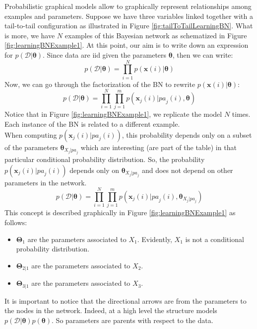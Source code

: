 Probabilistic graphical models allow to graphically represent relationships among examples and parameters. Suppose we have three variables linked together with a tail-to-tail configuration as illustrated in Figure \ref{fig:tailToTailLearningBN}. What is more, we have $N$ examples of this Bayesian network as schematized in Figure \ref{fig:learningBNExample1}. At this point, our aim is to write down an expression for $p(\mathcal{D}|\pmb{\theta})$. Since data are iid given the parameters $\pmb{\theta}$, then we can write:
$$p(\mathcal{D}|\pmb{\theta}) = \prod_{i=1}^N p(\pmb{x}(i) | \pmb{\theta})$$
Now, we can go through the factorization of the BN to rewrite $p(\pmb{x}(i) | \pmb{\theta})$:
$$p(\mathcal{D}|\pmb{\theta}) = \prod_{i=1}^N \prod_{j=1}^m p(\pmb{x}_j(i) | \mathit{pa}_j(i), \pmb{\theta})$$
Notice that in Figure \ref{fig:learningBNExample1}, we replicate the model $N$ times. Each instance of the BN is related to a different example.\\
When computing $p(\pmb{x}_j(i) | \mathit{pa}_j(i))$, this probability depends only on a subset of the parameters $\pmb{\theta}_{X_j | \mathit{pa}_j}$ which are interesting (are part of the table) in that particular conditional probability distribution. So, the probability $p(\pmb{x}_j(i) | \mathit{pa}_j(i))$ depends only on $\pmb{\theta}_{X_j | \mathit{pa}_j}$ and does not depend on other parameters in the network.
\begin{equation}
\label{eq:factorizationLearningBN}
  p(\mathcal{D}|\pmb{\theta}) = \prod_{i=1}^N \prod_{j=1}^m p(\pmb{x}_j(i) | \mathit{pa}_j(i), \pmb{\theta}_{X_j | \mathit{pa}_j})  
\end{equation}
This concept is described graphically in Figure \ref{fig:learningBNExample1} as follows:
\begin{itemize}
    \item $\pmb{\Theta}_1$ are the parameters associated to $X_1$. Evidently, $X_1$ is not a conditional probability distribution.
    \item $\pmb{\Theta}_{2|1}$ are the parameters associated to $X_2$.
    \item $\pmb{\Theta}_{3|1}$ are the parameters associated to $X_3$.
\end{itemize}
It is important to notice that the directional arrows are from the parameters to the nodes in the network. Indeed, at a high level the structure models $p(\mathcal{D}|\pmb{\theta}) p(\pmb{\theta})$. So parameters are parents with respect to the data. \newline

